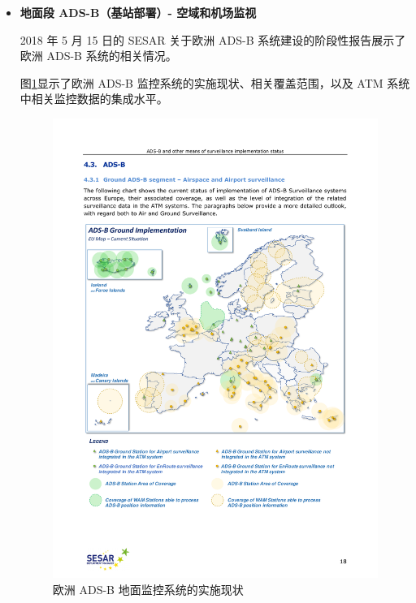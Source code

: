 \begin{itemize}

    \item \textbf{地面段 ADS-B（基站部署）- 空域和机场监视}

    2018 年 5 月 15 日的 SESAR 关于欧洲 ADS-B 系统建设的阶段性报告展示了欧洲 ADS-B 系统的相关情况。

    图\ref{fig:20180515-sesar-ads-b-report_18}显示了欧洲 ADS-B 监控系统的实施现状、相关覆盖范围，以及 ATM 系统中相关监控数据的集成水平。

    \begin{figure}[!htb]
    \centering
    \includegraphics[width=14cm]{pic/20180515-sesar-ads-b-report_18.pdf}
    \caption{欧洲 ADS-B 地面监控系统的实施现状\protect\footnotemark}
    \label{fig:20180515-sesar-ads-b-report_18}
    \end{figure}


\end{itemize}
